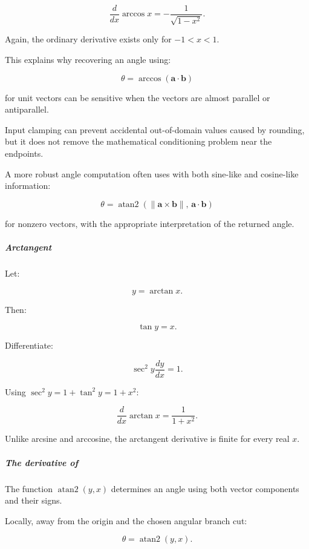 \[
\boxed{\frac d{dx}\arccos x=-\frac1{\sqrt{1-x^2}}}.
\]

Again, the ordinary derivative exists only for \(-1<x<1\).

This explains why recovering an angle using:

\[
\theta=\arccos(\mathbf a\cdot\mathbf b)
\]

for unit vectors can be sensitive when the vectors are almost parallel or antiparallel.

Input clamping can prevent accidental out-of-domain values caused by rounding, but it does not remove the mathematical conditioning problem near the endpoints.

A more robust angle computation often uses  with both sine-like and cosine-like information:

\[
\theta=\operatorname{atan2} \left(\|\mathbf a\times\mathbf b\|,\, \mathbf a\cdot\mathbf b\right)
\]

for nonzero vectors, with the appropriate interpretation of the returned angle.

\subparagraph{Arctangent}\label{01-foundations-i-ch020-arctangent}

\hypertarget{01-foundations-i-ch020-arctangent}{}

Let:

\[
y=\arctan x.
\]

Then:

\[
\tan y=x.
\]

Differentiate:

\[
\sec^2y\frac{dy}{dx}=1.
\]

Using \(\sec^2y=1+\tan^2y=1+x^2\):

\[
\boxed{\frac d{dx}\arctan x=\frac1{1+x^2}}.
\]

Unlike arcsine and arccosine, the arctangent derivative is finite for every real \(x\).

\subparagraph{\texorpdfstring{The derivative of }{The derivative of }}\label{01-foundations-i-ch020-the-derivative-of-atan2}

\hypertarget{01-foundations-i-ch020-the-derivative-of-atan2}{}

The function \(\operatorname{atan2}(y,x)\) determines an angle using both vector components and their signs.

Locally, away from the origin and the chosen angular branch cut:

\[
\theta=\operatorname{atan2}(y,x).
\]

